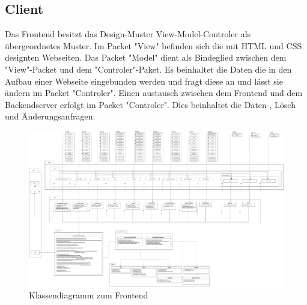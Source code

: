 \subsection{Client}
Das Frontend besitzt das Design-Muster View-Model-Controler als übergeordnetes Muster. Im Packet "View" befinden sich die mit HTML und CSS designten Webseiten. Das Packet "Model" dient als Bindeglied zwischen dem "View"-Packet und dem "Controler"-Paket. Es beinhaltet die Daten die in den Aufbau einer Webseite eingebunden werden und fragt diese an und lässt sie ändern im Packet "Controler". Einen austausch zwischen dem Frontend und dem Backendserver erfolgt im Packet "Controler". Dies beinhaltet die Daten-, Lösch und Änderungsanfragen.

\begin{figure}[H]
\centerline{\includegraphics[scale=0.2]{res/FrontendUML.drawio.pdf}}
\caption{Klassendiagramm zum Frontend}
\end{figure}

\newpage